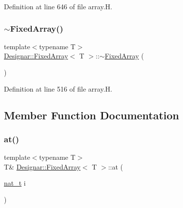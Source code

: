 Definition at line 646 of file array.\+H.

\mbox{\label{class_designar_1_1_fixed_array_adfe330be4cd4afd6a097cf5abd2cec38}} 
\subsubsection{\texorpdfstring{$\sim$\+Fixed\+Array()}{~FixedArray()}}
{\footnotesize\ttfamily template$<$typename T$>$ \\
\hyperlink{class_designar_1_1_fixed_array}{Designar\+::\+Fixed\+Array}$<$ T $>$\+::$\sim$\hyperlink{class_designar_1_1_fixed_array}{Fixed\+Array} (\begin{DoxyParamCaption}{ }\end{DoxyParamCaption})\hspace{0.3cm}{\ttfamily [inline]}}



Definition at line 516 of file array.\+H.



\subsection{Member Function Documentation}
\mbox{\label{class_designar_1_1_fixed_array_ae47f2f299aaef27f2decc88f2fd863a9}} 
\subsubsection{\texorpdfstring{at()}{at()}\hspace{0.1cm}{\footnotesize\ttfamily [1/2]}}
{\footnotesize\ttfamily template$<$typename T$>$ \\
T\& \hyperlink{class_designar_1_1_fixed_array}{Designar\+::\+Fixed\+Array}$<$ T $>$\+::at (\begin{DoxyParamCaption}\item[{\hyperlink{namespace_designar_aa72662848b9f4815e7bf31a7cf3e33d1}{nat\+\_\+t}}]{i }\end{DoxyParamCaption})\hspace{0.3cm}{\ttfamily [inline]}}



